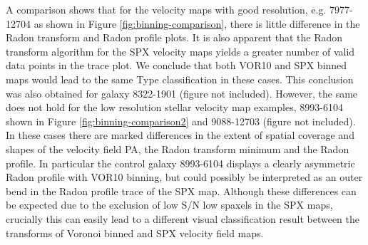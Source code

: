 A comparison shows that for the velocity maps with good resolution, e.g. 7977-12704 as shown in Figure \ref{fig:binning-comparison},  there is little difference in the Radon transform and Radon profile plots. It is also apparent that the Radon transform algorithm for the SPX velocity maps yields a greater number of valid data points in the trace plot. We conclude that both VOR10 and SPX binned maps would lead to the same Type classification in these cases. This conclusion was also obtained for galaxy 8322-1901 (figure not included).  However, the same does not hold for the low resolution stellar velocity map examples, 8993-6104 shown in Figure \ref{fig:binning-comparison2} and 9088-12703 (figure not included). In these cases there are marked differences in the extent of spatial coverage and shapes of the velocity field PA, the Radon transform minimum and the Radon profile. In particular the control galaxy 8993-6104 displays a clearly asymmetric Radon profile with VOR10 binning, but could possibly be interpreted as an outer bend in the Radon profile trace of the SPX map. Although these differences can be expected due to the exclusion of low S/N low spaxels in the SPX maps, crucially this can easily lead to a different visual classification result between the transforms of Voronoi binned and SPX velocity field maps. 
